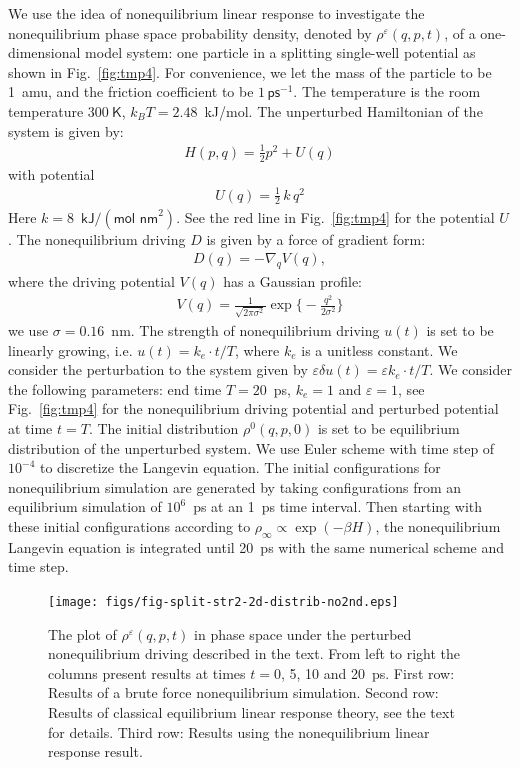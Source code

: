 \documentclass[]{tMPH2e}
\newcommand{\recheck}[1]{{\color{red} #1}}
\newcommand{\eps}{\varepsilon}
\begin{document}
We use the idea of nonequilibrium linear response to investigate the
nonequilibrium phase space probability density, denoted by $\rho^\eps(q, p, t)$, of a one-dimensional model system: one particle in a
splitting single-well potential as shown in Fig.~\ref{fig:tmp4}.  For convenience, we let the mass of
the particle to be 1~\textsf{amu}, and the friction coefficient to be
$1\,\textsf{ps}^{-1}$.
The temperature is the
room temperature $300\ \textsf{K}$, $k_BT = 2.48$~\textsf{kJ/mol}.
The unperturbed Hamiltonian of the system is
given by:
\begin{align}
  H ( p,  q) = \frac 12  p^2 + U( q) 
\end{align}
with potential
\begin{align}
  U( q) = \frac12\,k\, q^2 
\end{align}
Here $k = 8$~$\textsf{kJ} / (\textsf{mol nm}^2)$.
See the red line in Fig.~\ref{fig:tmp4} for the  potential $U$.
The nonequilibrium driving $ D$ is given by a force of gradient form:
\begin{align}
   D( q) = -\nabla_{ q} V( q) ,
\end{align}
where the driving potential $V( q)$ has a Gaussian profile:
\begin{align}
  V( q) = \frac{1}{\sqrt{2\pi \sigma^2}}
  \exp\Big\{-\frac{ q^2}{2\sigma^2}\Big\}
\end{align}
we use $\sigma = 0.16$~\textsf{nm}.  The strength of nonequilibrium
driving $u(t)$ is set to be linearly growing, i.e. $ u(t) = k_e\cdot t/T$,
where $k_e$ is a unitless constant.
We
consider the perturbation to the system given by $\eps\delta u(t) = \eps k_e \cdot t/T$.
We consider the following parameters: end time $T = 20$~\textsf{ps}, 
$k_e = 1$ and $\eps = 1$, see Fig.~\ref{fig:tmp4}
for the nonequilibrium driving potential and perturbed
potential at time $t = T$. The initial distribution $\rho^0(q, p, 0)$ is set to
be equilibrium distribution of the unperturbed system.
\recheck{
  We use Euler scheme with time step of $10^{-4}$ to discretize the
  Langevin equation. The initial configurations for nonequilibrium
  simulation are generated by taking configurations
  from an equilibrium simulation of $10^6$~\textsf{ps} at an 1~\textsf{ps} time interval.
  Then starting with these initial configurations according to $\rho_{\infty}\propto\exp(-\beta H)$,  the nonequilibrium
  Langevin equation is integrated until 20~\textsf{ps} with the same numerical
  scheme and time step.
}

\begin{figure}
  \centering
  \texttt{[image: figs/fig-split-str2-2d-distrib-no2nd.eps]}
  \caption{ The plot of $ \rho^\eps(q,p,t)$ in  phase
    space under the perturbed nonequilibrium driving described in the text. From left to right the columns present results at times $t =
    0$, 5, 10 and 20~\textsf{ps}.  First row: Results of a brute force
    nonequilibrium simulation. Second row: Results of
    classical equilibrium linear response theory, see the text for details. Third row: Results using the
    nonequilibrium linear response result.  }
  \label{fig:tmp6}
\end{figure}
\end{document}
